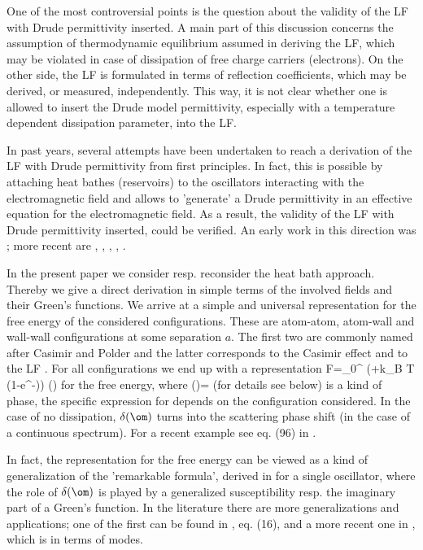 \documentclass[notitlepage,prd,aps,longbibliography,twocolumn]{revtex4-1}
\begin{document}
One of the most controversial points is the question about the validity of the LF with Drude permittivity inserted. A main part of this discussion concerns the assumption of thermodynamic equilibrium assumed in deriving the LF, which may be violated in case of dissipation of free charge carriers (electrons). On the other side, the LF is formulated in terms of reflection coefficients, which may be derived, or measured, independently. This way, it is not clear whether one is allowed to insert the Drude model permittivity, especially with a temperature dependent dissipation parameter, into the LF.

In past years, several attempts have been undertaken to reach a derivation of the LF with Drude permittivity from first principles. In fact, this is possible by attaching heat bathes (reservoirs) to the oscillators interacting with the electromagnetic field and allows to 'generate' a Drude permittivity in an effective equation for the electromagnetic field. As a result, the validity of the LF with Drude permittivity inserted, could be verified. An early work in this direction was \cite{bara75-116-5}; more recent are \cite{kupi92-46-2286}, \cite{rosa11-84-053813}, \cite{lomb11-84-052517}, \cite{lope17-28-025009}, \cite{brau17-190-237}.


In the present paper we consider resp. reconsider the heat bath approach. Thereby we give a direct derivation in simple terms of the involved fields and their Green's functions. We arrive at a simple and universal representation for the free energy of the considered configurations.
These are atom-atom, atom-wall and wall-wall configurations at some separation $a$. The first two are commonly named after Casimir and Polder \cite{casi48-73-360} and the latter corresponds to the Casimir effect \cite{casi48-51-793} and to the LF \cite{lifs56-2-73}. For all configurations we end up with a representation
%
\be F=\int_0^\infty {}
    \left(+k_{\rm B} T \ln\left(1-e^{-\beta\hbar\om}\right)\right)
       \frac{\pa}{\pa \om}\delta(\om)
\label{1}\ee
%
for the free energy, where
%
\be \delta(\om)=\ln{}
\label{2}\ee
%
(for details see below) is a kind of phase, the specific expression for   depends  on the configuration considered. In the case of no dissipation, $\delta(\om)$ turns into the scattering phase shift (in the case of a continuous spectrum).
{For a recent example see eq. (96) in \cite{D17-1}.}

In fact, the representation  for the free energy can be viewed as a kind of generalization of the 'remarkable formula', derived in \cite{ford85-55-2273} for a single oscillator, where the role of $\delta(\om)$ is played by a generalized susceptibility resp. the imaginary part of a Green's function. In the literature there are more generalizations and applications; one of the first can be found in \cite{bara75-116-5}, eq. (16), and a more recent one in \cite{intr12-86-062517}, which is in terms of modes.
\end{document}

